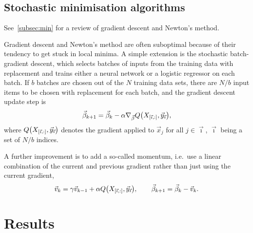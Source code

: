 \documentclass[11pt,british,a4paper]{article}
\numberwithin{equation}{section}
\begin{document}
\subsection{Stochastic minimisation algorithms}
See~\vref{subsec:min} for a review of gradient descent and Newton's method.

Gradient descent and Newton's method are often suboptimal because of their tendency to get stuck in local minima.
A simple extension is the stochastic batch-gradient descent, which selects batches of inputs from the training data with replacement and trains either a neural network or a logistic regressor on each batch. If \(b\) batches are chosen out of the \(N\) training data sets, there are \(N/b\) input items to be chosen with replacement for each batch, and the gradient descent update step is
\begin{equation}
    \vec{\beta}_{k+1} = \vec{\beta}_k - \alpha \nabla_{\vec{\beta}} Q\qty(X_{\qty[\vec{\imath},:]},\vec{y}_{\vec{\imath}}),
\end{equation}
where \(Q\qty(X_{\qty[\vec{\imath},:]},\vec{y}_{\vec{\imath}})\) denotes the gradient applied to \(\vec{x}_j\) for all \(j\in\vec{\imath}\), \(\vec{\imath}\) being a set of \(N/b\) indices.

A further improvement is to add a so-called momentum, i.e.\ use a linear combination of the current and previous gradient rather than just using the current gradient,
\begin{equation}
    \vec{v}_{k} = \gamma \vec{v}_{k-1} + \alpha Q\qty(X_{\qty[\vec{\imath},:]},\vec{y}_{\vec{\imath}}), \qquad
    \vec{\beta}_{k+1} = \vec{\beta}_k - \vec{v}_k.
\end{equation}

\section{Results}
\end{document}
